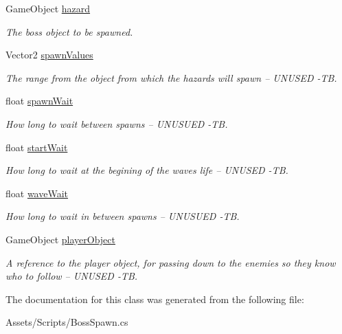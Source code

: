 \begin{DoxyCompactItemize}
\item 
\mbox{\label{class_boss_spawn_a5fde10547d9cd6309ee29a636a042081}} 
Game\+Object \mbox{\hyperlink{class_boss_spawn_a5fde10547d9cd6309ee29a636a042081}{hazard}}
\begin{DoxyCompactList}\small\item\em The boss object to be spawned. \end{DoxyCompactList}\item 
\mbox{\label{class_boss_spawn_a86c641a6ea5754b9160ae4c0a0a8668d}} 
Vector2 \mbox{\hyperlink{class_boss_spawn_a86c641a6ea5754b9160ae4c0a0a8668d}{spawn\+Values}}
\begin{DoxyCompactList}\small\item\em The range from the object from which the hazards will spawn -- U\+N\+U\+S\+ED -\/TB. \end{DoxyCompactList}\item 
\mbox{\label{class_boss_spawn_aa09381d8f6025a408b13c7df16568ff0}} 
float \mbox{\hyperlink{class_boss_spawn_aa09381d8f6025a408b13c7df16568ff0}{spawn\+Wait}}
\begin{DoxyCompactList}\small\item\em How long to wait between spawns -- U\+N\+U\+S\+U\+ED -\/TB. \end{DoxyCompactList}\item 
\mbox{\label{class_boss_spawn_a96261ab1bd409caeb45cd8d59426b518}} 
float \mbox{\hyperlink{class_boss_spawn_a96261ab1bd409caeb45cd8d59426b518}{start\+Wait}}
\begin{DoxyCompactList}\small\item\em How long to wait at the begining of the wave\textquotesingle{}s life -- U\+N\+U\+S\+ED -\/TB. \end{DoxyCompactList}\item 
\mbox{\label{class_boss_spawn_a8a35320ba7ac1e86bf1c913647f8b09c}} 
float \mbox{\hyperlink{class_boss_spawn_a8a35320ba7ac1e86bf1c913647f8b09c}{wave\+Wait}}
\begin{DoxyCompactList}\small\item\em How long to wait in between spawns -- U\+N\+U\+S\+U\+ED -\/TB. \end{DoxyCompactList}\item 
\mbox{\label{class_boss_spawn_acf908e160b37dbbae76a3bf8ee3ed6d4}} 
Game\+Object \mbox{\hyperlink{class_boss_spawn_acf908e160b37dbbae76a3bf8ee3ed6d4}{player\+Object}}
\begin{DoxyCompactList}\small\item\em A reference to the player object, for passing down to the enemies so they know who to follow -- U\+N\+U\+S\+ED -\/TB. \end{DoxyCompactList}\end{DoxyCompactItemize}


The documentation for this class was generated from the following file\+:\begin{DoxyCompactItemize}
\item 
Assets/\+Scripts/Boss\+Spawn.\+cs\end{DoxyCompactItemize}
